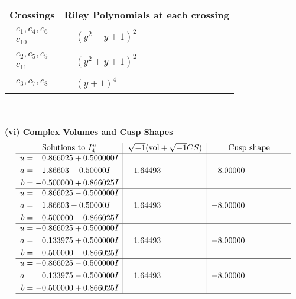 \documentclass[1p]{elsarticle_modified}
\theoremstyle{definition}
\newcommand{\I}{\sqrt{-1}}
\begin{document}
\begin{tabular}{m{50pt}|m{274pt}}
Crossings & \hspace{64pt}Riley Polynomials at each crossing \\
\hline $$\begin{aligned}c_{1},c_{4},c_{6}\\c_{10}\end{aligned}$$&$\begin{aligned}
&(y^2- y+1)^2
\end{aligned}$\\
\hline $$\begin{aligned}c_{2},c_{5},c_{9}\\c_{11}\end{aligned}$$&$\begin{aligned}
&(y^2+y+1)^2
\end{aligned}$\\
\hline $$\begin{aligned}c_{3},c_{7},c_{8}\end{aligned}$$&$\begin{aligned}
&(y+1)^4
\end{aligned}$\\
\hline
\end{tabular}\\~\\
\newpage\flushleft \textbf{(vi) Complex Volumes and Cusp Shapes}
$$\begin{array}{c|c|c}  
\text{Solutions to }I^u_{4}& \I (\text{vol} + \sqrt{-1}CS) & \text{Cusp shape}\\
 \hline 
\begin{aligned}
u &= \phantom{-}0.866025 + 0.500000 I \\
a &= \phantom{-}1.86603 + 0.50000 I \\
b &= -0.500000 + 0.866025 I\end{aligned}
 & \phantom{-}1.64493\phantom{ +0.000000I} & -8.00000\phantom{ +0.000000I} \\ \hline\begin{aligned}
u &= \phantom{-}0.866025 - 0.500000 I \\
a &= \phantom{-}1.86603 - 0.50000 I \\
b &= -0.500000 - 0.866025 I\end{aligned}
 & \phantom{-}1.64493\phantom{ +0.000000I} & -8.00000\phantom{ +0.000000I} \\ \hline\begin{aligned}
u &= -0.866025 + 0.500000 I \\
a &= \phantom{-}0.133975 + 0.500000 I \\
b &= -0.500000 - 0.866025 I\end{aligned}
 & \phantom{-}1.64493\phantom{ +0.000000I} & -8.00000\phantom{ +0.000000I} \\ \hline\begin{aligned}
u &= -0.866025 - 0.500000 I \\
a &= \phantom{-}0.133975 - 0.500000 I \\
b &= -0.500000 + 0.866025 I\end{aligned}
 & \phantom{-}1.64493\phantom{ +0.000000I} & -8.00000\phantom{ +0.000000I}\\
 \hline 
 \end{array}$$\newpage
\end{document}
